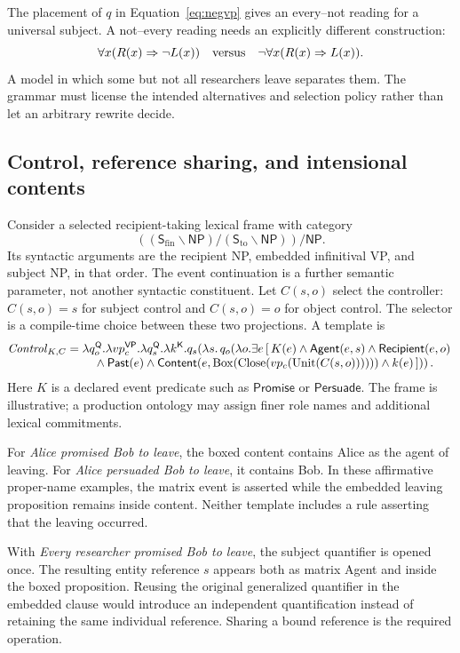 \documentclass[11pt,a4paper]{article}
\newcommand{\Q}{\mathsf{Q}}
\newcommand{\KK}{\mathsf{K}}
\newcommand{\VP}{\mathsf{VP}}
\newcommand{\NP}{\mathsf{NP}}
\newcommand{\SF}{\mathsf{S}_{\mathrm{fin}}}
\newcommand{\ST}{\mathsf{S}_{\mathrm{to}}}
\newcommand{\Close}{\operatorname{Close}}
\newcommand{\Unit}{\operatorname{Unit}}
\newcommand{\Bx}{\operatorname{Box}}
\begin{document}
The placement of \(q\) in Equation~\eqref{eq:negvp} gives an every--not
reading for a universal subject. A not--every reading needs an explicitly
different construction:
\[
  \forall x(R(x)\Rightarrow\neg L(x))
  \quad\hbox{versus}\quad
  \neg\forall x(R(x)\Rightarrow L(x)).
\]
A model in which some but not all researchers leave separates them. The
grammar must license the intended alternatives and selection policy rather
than let an arbitrary rewrite decide.

\subsection{Control, reference sharing, and intensional contents}
Consider a selected recipient-taking lexical frame with category
\[
  ((\SF\backslash\NP)/(\ST\backslash\NP))/\NP .
\]
Its syntactic arguments are the recipient NP, embedded infinitival VP, and
subject NP, in that order. The event continuation is a further semantic
parameter, not another syntactic constituent. Let \(C(s,o)\) select the controller:
\(C(s,o)=s\) for subject control and \(C(s,o)=o\) for object control.
The selector is a compile-time choice between these two projections. A template is
\begin{align}
 &\mathit{Control}_{K,C}
   =\lambda q_o^{\Q}.\lambda vp_c^{\VP}.\lambda q_s^{\Q}.\lambda k^{\KK}.
      q_s\!\left(\lambda s.\,q_o\!\left(\lambda o.
      \exists e\,[\,K(e)\land\mathsf{Agent}(e,s)
          \land\mathsf{Recipient}(e,o)\right.\right.\nonumber\\[-1mm]
 &\hspace{24mm}\left.\left.
       {}\land\mathsf{Past}(e)
       \land\mathsf{Content}\!\left(e,
          \Bx\!\left(\Close(vp_c(\Unit(C(s,o))))\right)\right)
       \land k(e)\,]\right)\right).
 \label{eq:control}
\end{align}
Here \(K\) is a declared event predicate such as \(\mathsf{Promise}\) or
\(\mathsf{Persuade}\). The frame is illustrative; a production ontology may
assign finer role names and additional lexical commitments.

For \emph{Alice promised Bob to leave}, the boxed content contains Alice as
the agent of leaving. For \emph{Alice persuaded Bob to leave}, it contains
Bob. In these affirmative proper-name examples, the matrix event is asserted
while the embedded leaving proposition remains inside content. Neither template includes a
rule asserting that the leaving occurred.

With \emph{Every researcher promised Bob to leave}, the subject quantifier
is opened once. The resulting entity reference \(s\) appears both as matrix
Agent and inside the boxed proposition. Reusing the original generalized
quantifier in the embedded clause would introduce an independent
quantification instead of retaining the same individual reference. Sharing a bound reference is the required operation.
\end{document}

